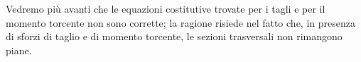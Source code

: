 Vedremo più avanti che  le equazioni costitutive trovate per i tagli e per il momento torcente non sono  corrette; la ragione risiede nel fatto che,  in presenza di sforzi di taglio e di momento torcente, le sezioni trasversali non rimangono piane. 
	
